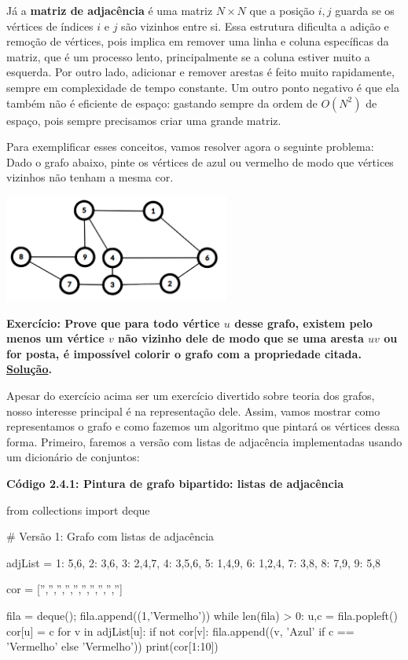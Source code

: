 \documentclass[11pt, a4paper]{article}
\begin{document}
Já a \textbf{matriz de adjacência} é uma matriz \(N\times N\) que a posição \(i,j\) guarda se os vértices de índices \(i\) e \(j\) são vizinhos entre si. Essa estrutura dificulta a adição e remoção de vértices, pois implica em remover uma linha e coluna específicas da matriz, que é um processo lento, principalmente se a coluna estiver muito a esquerda. Por outro lado, adicionar e remover arestas é feito muito rapidamente, sempre em complexidade de tempo constante. Um outro ponto negativo é que ela também não é eficiente de espaço: gastando sempre da ordem de \(O(N^2)\) de espaço, pois sempre precisamos criar uma grande matriz.

Para exemplificar esses conceitos, vamos resolver agora o seguinte problema: Dado o grafo abaixo, pinte os vértices de azul ou vermelho de modo que vértices vizinhos não tenham a mesma cor.

\begin{center}
\includegraphics[width=20em]{Imagens/bicolorgraph.png}
\end{center}

\label{ex2.4.a}

\textbf{Exercício: Prove que para todo vértice \(u\) desse grafo, existem pelo menos um vértice \(v\) não vizinho dele de modo que se uma aresta \(uv\) ou for posta, é impossível colorir o grafo com a propriedade citada. \hyperref[sol_ex2.4.a]{Solução}.}

Apesar do exercício acima ser um exercício divertido sobre teoria dos grafos, nosso interesse principal é na representação dele. Assim, vamos mostrar como representamos o grafo e como fazemos um algoritmo que pintará os vértices dessa forma. Primeiro, faremos a versão com listas de adjacência implementadas usando um dicionário de conjuntos:

\textbf{Código 2.4.1: Pintura de grafo bipartido: listas de adjacência}

\begin{code}
from collections import deque

# Versão 1: Grafo com listas de adjacência

adjList = {
    1: {5,6},
    2: {3,6},
    3: {2,4,7},
    4: {3,5,6},
    5: {1,4,9},
    6: {1,2,4},
    7: {3,8},
    8: {7,9},
    9: {5,8}
}

cor = ['','','','','','','','','','']

fila = deque(); fila.append((1,'Vermelho'))
while len(fila) > 0:
    u,c = fila.popleft()
    cor[u] = c
    for v in adjList[u]:
        if not cor[v]:
            fila.append((v, 'Azul' if c == 'Vermelho' else 'Vermelho'))
print(cor[1:10])
\end{code}
\end{document}
